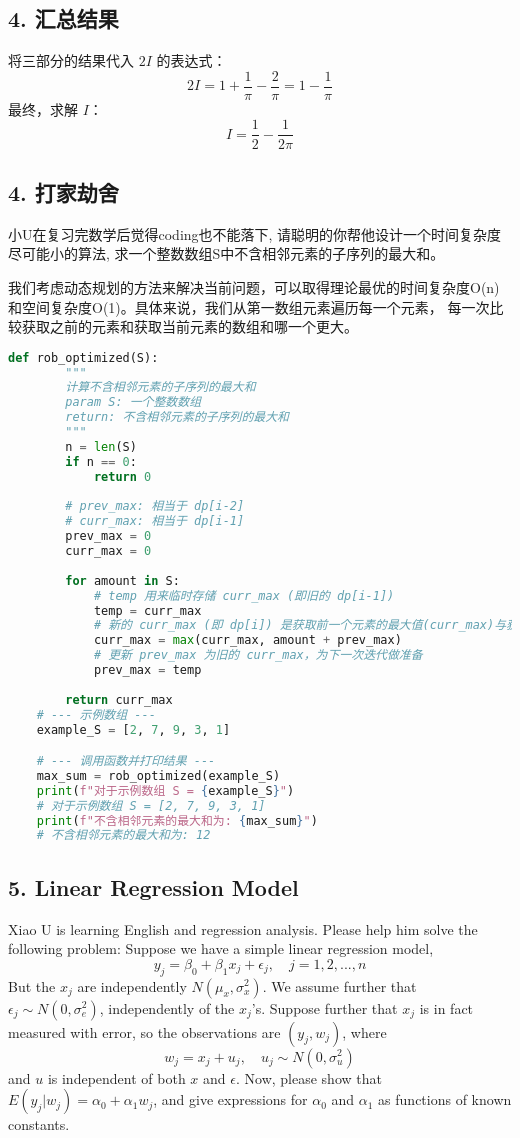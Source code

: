 \documentclass[UTF8]{ctexart}
\begin{document}
\subsection*{4. 汇总结果}
将三部分的结果代入 $2I$ 的表达式：
$$ 2I = 1 + \frac{1}{\pi} - \frac{2}{\pi} = 1 - \frac{1}{\pi} $$
最终，求解 $I$：
$$ I = \frac{1}{2} - \frac{1}{2\pi} $$

\subsection*{4. 打家劫舍}
小U在复习完数学后觉得coding也不能落下, 请聪明的你帮他设计一个时间复杂度尽可能小的算法, 求一个整数数组S中不含相邻元素的子序列的最大和。

我们考虑动态规划的方法来解决当前问题，可以取得理论最优的时间复杂度O(n)和空间复杂度O(1)。具体来说，我们从第一数组元素遍历每一个元素，
每一次比较获取之前的元素和获取当前元素的数组和哪一个更大。
\begin{lstlisting}[language=Python, caption=O(1) 空间复杂度 和 O(n) 时间复杂度的解法]
    def rob_optimized(S):
        """
        计算不含相邻元素的子序列的最大和
        param S: 一个整数数组
        return: 不含相邻元素的子序列的最大和
        """
        n = len(S)
        if n == 0:
            return 0
        
        # prev_max: 相当于 dp[i-2]
        # curr_max: 相当于 dp[i-1]
        prev_max = 0
        curr_max = 0
    
        for amount in S:
            # temp 用来临时存储 curr_max (即旧的 dp[i-1])
            temp = curr_max
            # 新的 curr_max (即 dp[i]) 是获取前一个元素的最大值(curr_max)与获得当前元素(amount + prev_max)的较大值
            curr_max = max(curr_max, amount + prev_max)
            # 更新 prev_max 为旧的 curr_max，为下一次迭代做准备
            prev_max = temp
    
        return curr_max
    # --- 示例数组 ---
    example_S = [2, 7, 9, 3, 1]

    # --- 调用函数并打印结果 ---
    max_sum = rob_optimized(example_S)
    print(f"对于示例数组 S = {example_S}")
    # 对于示例数组 S = [2, 7, 9, 3, 1]
    print(f"不含相邻元素的最大和为: {max_sum}") 
    # 不含相邻元素的最大和为: 12
\end{lstlisting}

\subsection*{5. Linear Regression Model}
Xiao U is learning English and regression analysis. Please help him solve the following problem:
Suppose we have a simple linear regression model,
$$ y_{j}=\beta_{0}+\beta_{1}x_{j}+\epsilon_{j}, \quad j=1,2,...,n $$
But the $x_{j}$ are independently $N(\mu_{x},\sigma_{x}^{2})$. We assume further that $\epsilon_{j}\sim N(0,\sigma_{e}^{2})$, independently of the $x_{j}$'s.
Suppose further that $x_{j}$ is in fact measured with error, so the observations are $(y_{j},w_{j})$, where
$$ w_{j}=x_{j}+u_{j}, \quad u_{j}\sim N(0,\sigma_{u}^{2}) $$
and $u$ is independent of both $x$ and $\epsilon$.
Now, please show that $E(y_{j}|w_{j})=\alpha_{0}+\alpha_{1}w_{j}$, and give expressions for $\alpha_{0}$ and $\alpha_{1}$ as functions of known constants.
\end{document}
